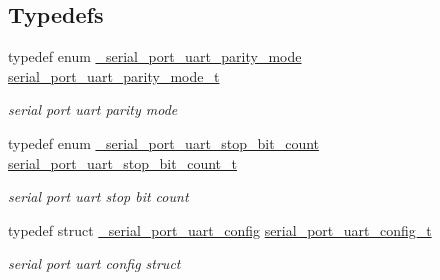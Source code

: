 \subsection*{Typedefs}
\begin{DoxyCompactItemize}
\item 
\mbox{\label{group__serial__port__uart_ga3980002a1791549605701a7822bec4ba}} 
typedef enum \mbox{\hyperlink{group__serial__port__uart_ga2d84542a7efc9d896f4e8d7221e1ec98}{\+\_\+serial\+\_\+port\+\_\+uart\+\_\+parity\+\_\+mode}} \mbox{\hyperlink{group__serial__port__uart_ga3980002a1791549605701a7822bec4ba}{serial\+\_\+port\+\_\+uart\+\_\+parity\+\_\+mode\+\_\+t}}
\begin{DoxyCompactList}\small\item\em serial port uart parity mode \end{DoxyCompactList}\item 
\mbox{\label{group__serial__port__uart_ga2a0798b3cc6db94c65bf067bcfe73b12}} 
typedef enum \mbox{\hyperlink{group__serial__port__uart_ga97aea0fa091f5d31407cd8b94bdc5f35}{\+\_\+serial\+\_\+port\+\_\+uart\+\_\+stop\+\_\+bit\+\_\+count}} \mbox{\hyperlink{group__serial__port__uart_ga2a0798b3cc6db94c65bf067bcfe73b12}{serial\+\_\+port\+\_\+uart\+\_\+stop\+\_\+bit\+\_\+count\+\_\+t}}
\begin{DoxyCompactList}\small\item\em serial port uart stop bit count \end{DoxyCompactList}\item 
\mbox{\label{group__serial__port__uart_gaeed027996311f4e385ebea09d3430d02}} 
typedef struct \mbox{\hyperlink{struct__serial__port__uart__config}{\+\_\+serial\+\_\+port\+\_\+uart\+\_\+config}} \mbox{\hyperlink{group__serial__port__uart_gaeed027996311f4e385ebea09d3430d02}{serial\+\_\+port\+\_\+uart\+\_\+config\+\_\+t}}
\begin{DoxyCompactList}\small\item\em serial port uart config struct \end{DoxyCompactList}\end{DoxyCompactItemize}

